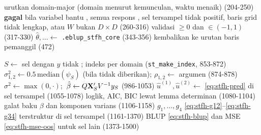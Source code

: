 \begin{algorithm}[htbp]
\caption{\texttt{eblup\_stfh} --- alur sebenarnya (\texttt{R/eblup\_stfh.R:164-480}, \texttt{src/eblup\_stfh\_core.cpp:826-1529})}
\label{alg:stfh}
urutkan domain-major (domain menurut kemunculan, waktu menaik) (204-250)\;
\textbf{gagal} bila variabel bantu , semua respons ,  sel tersampel tidak positif, baris grid tidak lengkap, atau $W$ bukan $D\times D$ (260-316)\;
validasi  $\ge0$ dan  $\in(-1,1)$ (317-330)\;
$\hat\theta,\ldots\leftarrow$ \texttt{.eblup\_stfh\_core} (343-356)\;
\;
kembalikan ke urutan baris pemanggil (472)\;
\caption*{}
$S\leftarrow$ sel dengan $y$ tidak ; indeks per domain (\texttt{st\_make\_index}, 853-872)\;
$\sigma_{1,2}^{2}\leftarrow0.5\,\mathrm{median}(\psi_S)$ (bila tidak diberikan);\quad
  $\rho_{1,2}\leftarrow$ argumen (874-878)\;
$\sigma^2\leftarrow\max(0,\cdot)$;\ $\hat\beta\leftarrow Q\mathbf{X}_S'V^{-1}y_S$ (986-1053)\;
$\hat u^{(1)},\hat u^{(2)}\leftarrow$ \eqref{eq:stfh-pred} di sel tersampel (1055-1078)\;
loglik, AIC, BIC lewat lemma determinan (1080-1104)\;
galat baku $\beta$ dan komponen varians (1106-1158)\;
$g_1,\dots,g_4$ \eqref{eq:stfh-g12}--\eqref{eq:stfh-g34} terstruktur di sel tersampel (1161-1370)\;
BLUP \eqref{eq:stfh-blup} dan MSE \eqref{eq:stfh-mse-oos} untuk sel lain (1373-1500)\;
\end{algorithm}

